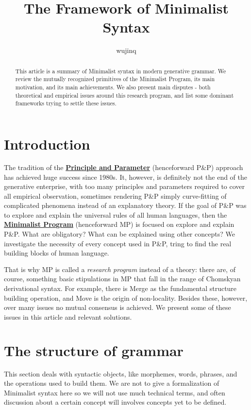 \documentclass[a4paper]{article}
\title{The Framework of Minimalist Syntax}
\author{wujinq}
\newcommand*{\concept}[1]{\underline{\textbf{#1}}}
\begin{document}
\maketitle

\begin{abstract}
    This article is a summary of Minimalist syntax in modern generative grammar.
    We review the mutually recognized primitives of the Minimalist Program, its main motivation, and its main achievements.
    We also present main disputes - both theoretical and empirical issues around this research program, and list some dominant frameworks trying to settle these issues.  
\end{abstract}


\section{Introduction}

The tradition of the \concept{Principle and Parameter} (henceforward P\&P) approach has achieved huge success since 1980s. 
It, however, is definitely not the end of the generative enterprise, with too many principles and parameters required to cover all empirical observation, sometimes rendering P\&P simply curve-fitting of complicated phenomena instead of an explanatory theory.
If the goal of P\&P was to explore and explain the universal rules of all human languages, then the \concept{Minimalist Program} (henceforward MP) is focused on explore and explain P\&P.
What are obligatory? What can be explained using other concepts? 
We investigate the necessity of every concept used in P\&P, tring to find the real building blocks of human language.

That is why MP is called a \emph{research program} instead of a theory: there are, of course, something basic stipulations in MP that fall in the range of Chomskyan derivational syntax.
For example, there is Merge as the fundamental structure building operation, and Move is the origin of non-locality.
Besides these, however, over many issues no mutual consensus is achieved. We present some of these issues in this article and relevant solutions.

\section{The structure of grammar}

This section deals with syntactic objects, like morphemes, words, phrases, and the operations used to build them.
We are not to give a formalization of Minimalist syntax here so we will not use much technical terms, 
and often discussion about a certain concept will involves concepts yet to be defined.
\end{document}
